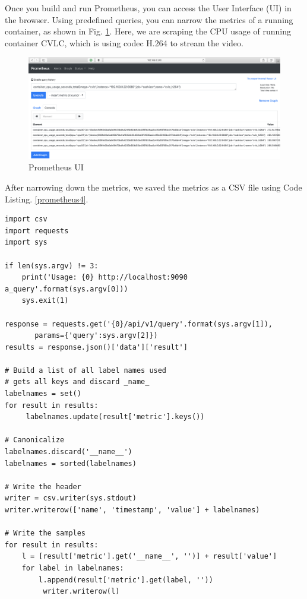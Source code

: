 Once you build and run Prometheus, you can access the User Interface (UI) in the browser. Using predefined queries, you can narrow the metrics of a running container, as shown in Fig. \ref {fig:Prometheus UI}. Here, we are scraping the CPU usage of running container CVLC, which is using codec H.264 to stream the video.

\begin{figure}[H]
	\centering
	\includegraphics[width=\textwidth]{images/PrometheusUI.png}
	\caption{Prometheus UI}
	\label{fig:Prometheus UI}
\end{figure}

After narrowing down the metrics, we saved the metrics as a CSV file using Code Listing. \ref{prometheus4}. 

\begin{lstlisting}[style=mypython, caption={Python script to save the metrics as csv file}, frame=single, label={prometheus4}]
import csv
import requests
import sys

if len(sys.argv) != 3:
	print('Usage: {0} http://localhost:9090 a_query'.format(sys.argv[0]))
	sys.exit(1)

response = requests.get('{0}/api/v1/query'.format(sys.argv[1]), 
       params={'query':sys.argv[2]})
results = response.json()['data']['result']

# Build a list of all label names used
# gets all keys and discard _name_
labelnames = set()
for result in results:
	 labelnames.update(result['metric'].keys())

# Canonicalize
labelnames.discard('__name__')
labelnames = sorted(labelnames)

# Write the header
writer = csv.writer(sys.stdout)
writer.writerow(['name', 'timestamp', 'value'] + labelnames)

# Write the samples
for result in results:
	l = [result['metric'].get('__name__', '')] + result['value']
	for label in labelnames:
		l.append(result['metric'].get(label, ''))
		 writer.writerow(l)		
\end{lstlisting}

